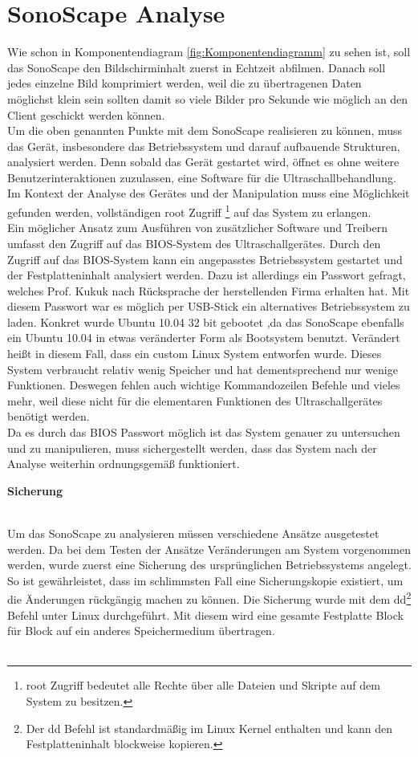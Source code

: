 \chapter{SonoScape Analyse}
Wie schon in Komponentendiagram \ref{fig:Komponentendiagramm} zu sehen ist, soll das SonoScape den Bildschirminhalt zuerst in Echtzeit abfilmen. Danach soll jedes einzelne Bild komprimiert werden, weil die zu übertragenen Daten möglichst klein sein sollten damit so viele Bilder pro Sekunde wie möglich an den Client geschickt werden können.\\
Um die oben genannten Punkte mit dem SonoScape realisieren zu können, muss das Gerät, insbesondere das Betriebssystem und darauf aufbauende Strukturen, analysiert werden. Denn sobald das Gerät gestartet wird, öffnet es ohne weitere  Benutzerinteraktionen zuzulassen, eine Software für die Ultraschallbehandlung. Im Kontext der Analyse des Gerätes und der Manipulation muss eine Möglichkeit gefunden werden, vollständigen root Zugriff \footnote{root Zugriff bedeutet alle Rechte über alle Dateien und Skripte auf dem System zu besitzen.} auf das System zu erlangen.\\ 
Ein möglicher Ansatz zum Ausführen von zusätzlicher Software und Treibern umfasst den Zugriff auf das BIOS-System des Ultraschallgerätes. Durch den Zugriff auf das BIOS-System kann ein angepasstes Betriebssystem gestartet und der Festplatteninhalt analysiert werden. Dazu ist allerdings ein Passwort gefragt, welches Prof. Kukuk nach Rücksprache der herstellenden Firma erhalten hat. Mit diesem Passwort war es möglich per USB-Stick ein alternatives Betriebssystem zu laden. Konkret wurde Ubuntu 10.04 32 bit gebootet ,da das SonoScape ebenfalls ein Ubuntu 10.04 in etwas veränderter Form als Bootsystem benutzt. Verändert heißt in diesem Fall, dass ein custom Linux System entworfen wurde. Dieses System verbraucht relativ wenig Speicher und hat dementsprechend nur wenige Funktionen. Deswegen fehlen auch wichtige Kommandozeilen Befehle und vieles mehr, weil diese nicht für die elementaren Funktionen des Ultraschallgerätes benötigt werden.\\
Da es durch das BIOS Passwort möglich ist das System genauer zu untersuchen und zu manipulieren, muss sichergestellt werden, dass das System nach der Analyse weiterhin ordnungsgemäß funktioniert. 
\clearpage
\begin{large}
\textbf{Sicherung}\\\\
\end{large}
Um das SonoScape zu analysieren müssen verschiedene Ansätze ausgetestet werden. Da bei dem Testen der Ansätze Veränderungen am System vorgenommen werden, wurde zuerst eine Sicherung des ursprünglichen Betriebssystems angelegt. So ist gewährleistet, dass im schlimmsten Fall eine Sicherungskopie existiert, um die Änderungen rückgängig machen zu können. Die Sicherung wurde mit dem dd\footnote{Der dd Befehl ist standardmäßig im Linux Kernel enthalten und kann den Festplatteninhalt blockweise kopieren. } Befehl unter Linux durchgeführt. Mit diesem wird eine gesamte Festplatte Block für Block auf ein anderes Speichermedium übertragen.\\\\
